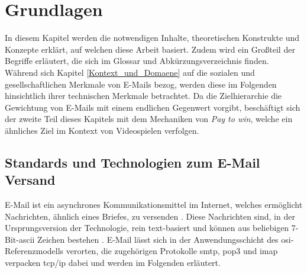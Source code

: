 
\chapter{Grundlagen}
\label{Grundlagen}

In diesem Kapitel werden die notwendigen Inhalte, theoretischen Konstrukte und Konzepte erklärt, auf welchen diese Arbeit basiert. Zudem wird ein Großteil der Begriffe erläutert, die sich im Glossar und Abkürzungsverzeichnis finden. Während sich Kapitel \ref{Kontext_und_Domaene} auf die sozialen und gesellschaftlichen Merkmale von E-Mails bezog, werden diese im Folgenden hinsichtlich ihrer technischen Merkmale betrachtet. Da die Zielhierarchie die Gewichtung von E-Mails mit einem endlichen Gegenwert vorgibt, beschäftigt sich der zweite Teil dieses Kapitels mit dem Mechaniken von \emph{Pay to win}, welche ein ähnliches Ziel im Kontext von Videospielen verfolgen.


\section{Standards und Technologien zum E-Mail Versand}

E-Mail ist ein asynchrones Kommunikationsmittel im Internet, welches ermöglicht Nachrichten, ähnlich eines Briefes, zu versenden \citep[S. 142]{Kurose2014}. Diese Nachrichten sind, in der Ursprungsversion der Technologie, rein text-basiert und können aus beliebigen 7-Bit-\acrshort{ascii} Zeichen bestehen \citep[S. 9]{RFC5322}. E-Mail lässt sich in der Anwendungsschicht des \acrshort{osi}-Referenzmodells verorten, die zugehörigen Protokolle \acrshort{smtp}, \acrshort{pop3} und \acrshort{imap} verpacken \acrshort{tcp}/\acrshort{ip} dabei und werden im Folgenden erläutert.

